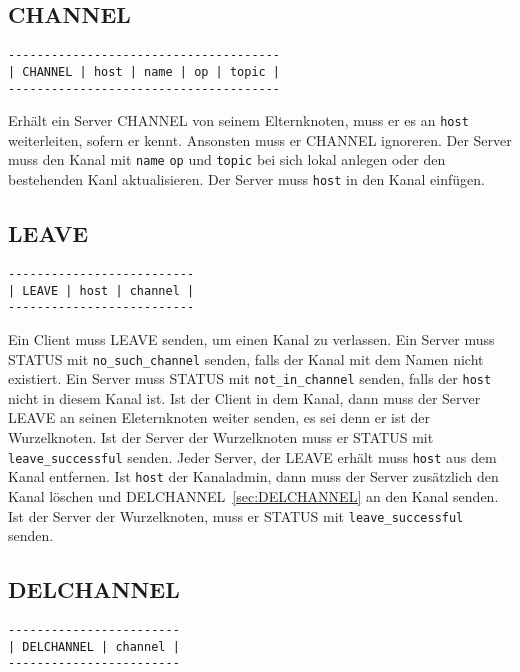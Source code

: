 \documentclass{article}
\begin{document}
\subsection{CHANNEL}

\begin{lstlisting}
--------------------------------------
| CHANNEL | host | name | op | topic |
--------------------------------------
\end{lstlisting}

Erhält ein Server CHANNEL von seinem Elternknoten, muss er es an \lstinline{host} weiterleiten, sofern er  kennt.
Ansonsten muss er CHANNEL ignoreren.
Der Server muss den Kanal mit \lstinline{name} \lstinline{op} und \lstinline{topic} bei sich lokal anlegen oder den bestehenden Kanl aktualisieren.
Der Server muss \lstinline{host} in den Kanal einfügen.

\subsection{LEAVE}

\begin{lstlisting}
--------------------------
| LEAVE | host | channel |
--------------------------
\end{lstlisting}

Ein Client muss LEAVE senden, um einen Kanal zu verlassen.
Ein Server muss STATUS mit \lstinline{no_such_channel} senden, falls der Kanal mit dem Namen  nicht existiert.
Ein Server muss STATUS mit \lstinline{not_in_channel} senden, falls der \lstinline{host} nicht in diesem Kanal ist.
Ist der Client in dem Kanal, dann muss der Server LEAVE an seinen Eleternknoten weiter senden, es sei denn er ist der Wurzelknoten. 
Ist der Server der Wurzelknoten muss er STATUS mit \lstinline{leave_successful} senden.
Jeder Server, der LEAVE erhält muss \lstinline{host} aus dem Kanal entfernen.
Ist \lstinline{host} der Kanaladmin, dann muss der Server zusätzlich den Kanal löschen und DELCHANNEL~\ref{sec:DELCHANNEL} an den Kanal senden.
Ist der Server der Wurzelknoten, muss er STATUS mit \lstinline{leave_successful} senden.

\subsection{DELCHANNEL}

\begin{lstlisting}
------------------------
| DELCHANNEL | channel |
------------------------
\end{lstlisting}
\end{document}
